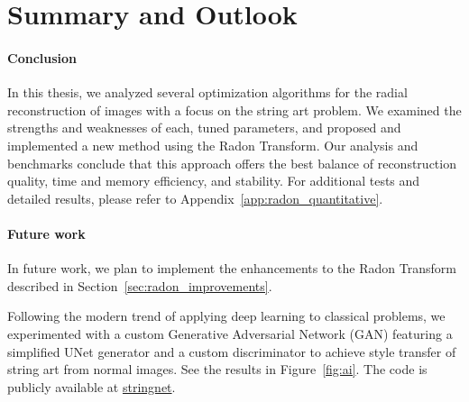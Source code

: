 \chapter{Summary and Outlook}

\subsubsection{Conclusion}

In this thesis, we analyzed several optimization algorithms for the radial reconstruction of images  with a focus on the string art problem. We examined the strengths and weaknesses of each, tuned parameters, and proposed and implemented a new method using the Radon Transform. Our analysis and benchmarks conclude that this approach offers the best balance of reconstruction quality, time and memory efficiency, and stability. For additional tests and detailed results, please refer to Appendix~\ref{app:radon_quantitative}.

\subsubsection{Future work}

In future work, we plan to implement the enhancements to the Radon Transform described in Section~\ref{sec:radon_improvements}. 

Following the modern trend of applying deep learning to classical problems, we experimented with a custom Generative Adversarial Network (GAN) featuring a simplified UNet generator and a custom discriminator to achieve style transfer of string art from normal images. See the results in Figure~\ref{fig:ai}. The code is publicly available at \href{https://github.com/skpha13/stringnet}{stringnet}.

